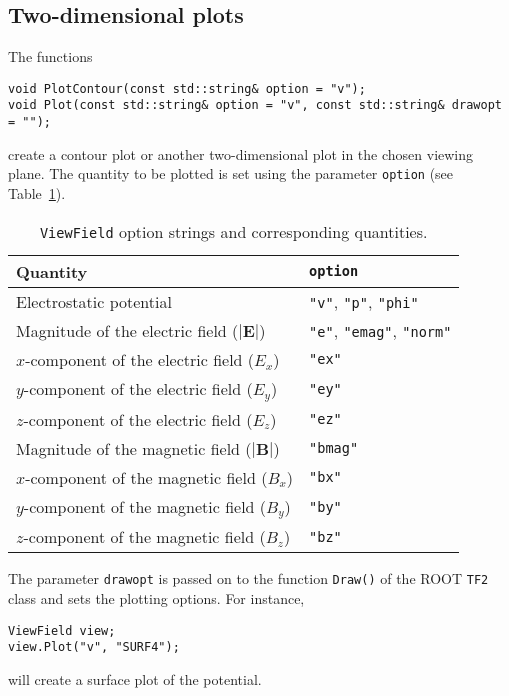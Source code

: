 \subsection{Two-dimensional plots}

The functions 
\begin{lstlisting}
void PlotContour(const std::string& option = "v");
void Plot(const std::string& option = "v", const std::string& drawopt = "");
\end{lstlisting}
create a contour plot or another two-dimensional plot in the chosen viewing plane.
The quantity to be plotted is set using the parameter \texttt{option} 
(see Table~\ref{Tab:ViewFieldOptionStrings}).
\begin{table}
  \centering
  \caption{\texttt{ViewField} option strings and corresponding quantities.}
  \label{Tab:ViewFieldOptionStrings}
  \begin{tabular}{l l} 
    \toprule
    Quantity & \texttt{option} \\
    \midrule
    Electrostatic potential & \texttt{"v"}, \texttt{"p"}, \texttt{"phi"} \\
    Magnitude of the electric field ($\left|\mathbf{E}\right|$) & \texttt{"e"}, \texttt{"emag"}, \texttt{"norm"} \\
    $x$-component of the electric field ($E_{x}$) & \texttt{"ex"} \\ 
    $y$-component of the electric field ($E_{y}$) & \texttt{"ey"} \\ 
    $z$-component of the electric field ($E_{z}$) & \texttt{"ez"} \\
    \midrule 
    Magnitude of the magnetic field ($\left|\mathbf{B}\right|$) & \texttt{"bmag"} \\
    $x$-component of the magnetic field ($B_{x}$) & \texttt{"bx"} \\ 
    $y$-component of the magnetic field ($B_{y}$) & \texttt{"by"} \\ 
    $z$-component of the magnetic field ($B_{z}$) & \texttt{"bz"} \\ 
    \bottomrule
  \end{tabular}
\end{table}
The parameter \texttt{drawopt} is passed on to the function \texttt{Draw()} of the
ROOT \texttt{TF2} class and sets the plotting options. For instance,
\begin{lstlisting}
ViewField view;
view.Plot("v", "SURF4");
\end{lstlisting}
will create a surface plot of the potential.

